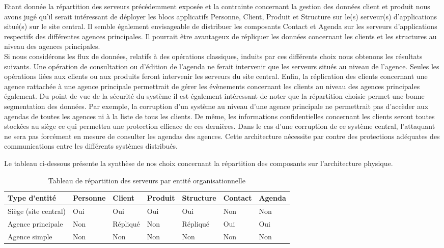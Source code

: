 Etant donnée la répartition des serveurs précédemment exposée et la contrainte concernant la gestion des données client et produit nous avons jugé qu'il serait intéressant de déployer les blocs applicatifs Personne, Client, Produit et Structure sur le(s) serveur(s) d'applications situé(s) sur le site central. Il semble également envisageable de distribuer les composants Contact et Agenda sur les serveurs d'applications respectifs des différentes agences principales. Il pourrait être avantageux de répliquer les données concernant les clients et les structures au niveau des agences principales. \\

Si nous considérons les flux de données, relatifs à des opérations classiques, induits par ces différents choix nous obtenons les résultats suivants. Une opération de consultation ou d'édition de l'agenda ne ferait intervenir que les serveurs situés au niveau de l'agence. Seules les opérations liées aux clients ou aux produits feront intervenir les serveurs du site central. Enfin, la réplication des clients concernant une agence rattachée à une agence principale permettrait de gérer les évènements concernant les clients au niveau des agences principales également.
Du point de vue de la sécurité du système il est également intéressant de noter que la répartition choisie permet une bonne segmentation des données. Par exemple, la corruption d'un système au niveau d'une agence principale ne permettrait pas d'accèder aux agendas de toutes les agences ni à la liste de tous les clients. De même, les informations confidentielles concernant les clients seront toutes stockées au siège ce qui permettra une protection efficace de ces dernières. Dans le cas d'une corruption de ce système central, l'attaquant ne sera pas forcément en mesure de consulter les agendas des agences. Cette architecture nécessite par contre des protections adéquates des communications entre les différents systèmes distribués.

Le tableau ci-dessous présente la synthèse de nos choix concernant la répartition des composants sur l'architecture physique. 

\begin{table}[H]
    \centering
    \begin{tabular}{l|l|l|l|l|l|l}
    Type d'entité        & Personne & Client   & Produit & Structure & Contact & Agenda \\ \hline
    Siège (site central) & Oui      & Oui      & Oui     & Oui       & Non     & Non    \\
    Agence principale    & Non      & Répliqué & Non     & Répliqué  & Oui     & Oui    \\
    Agence simple        & Non      & Non      & Non     & Non       & Non     & Non    \\
    \end{tabular}
    \caption{Tableau de répartition des serveurs par entité organisationnelle}
\end{table}

